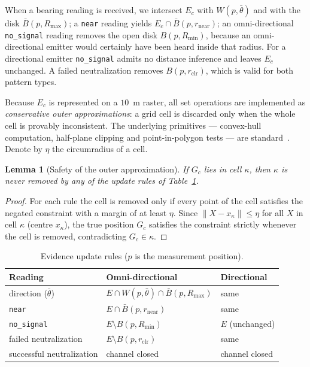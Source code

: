 \documentclass[preprint,12pt,3p]{elsarticle}
\newtheorem{lemma}[theorem]{Lemma}
\theoremstyle{definition}
\newcommand{\Rmin}{R_{\min}}
\newcommand{\Rmax}{R_{\max}}
\begin{document}
When a bearing reading is received, we intersect $E_c$ with $W(p,\bar\theta)$ and with the disk
$\bar B(p,\Rmax)$; a \texttt{near} reading yields $E_c\cap\bar B(p,r_{\mathrm{near}})$; an
omni-directional \texttt{no\_signal} reading removes the open disk $B(p,\Rmin)$, because an
omni-directional emitter would certainly have been heard inside that radius. For a directional
emitter \texttt{no\_signal} admits no distance inference and leaves $E_c$ unchanged. A failed
neutralization removes $B(p,r_{\mathrm{clr}})$, which is valid for both pattern types.

Because $E_c$ is represented on a $10$~m raster, all set operations are implemented as
\emph{conservative outer approximations}: a grid cell is discarded only when the whole cell is
provably inconsistent. The underlying primitives --- convex-hull computation, half-plane clipping
and point-in-polygon tests --- are standard~\cite{preparata1985}. Denote by $\eta$ the
circumradius of a cell.

\begin{lemma}[Safety of the outer approximation]
\label{lem:outer}
If $G_c$ lies in cell $\kappa$, then $\kappa$ is never removed by any of the update rules of
Table~\ref{tab:ops}.
\end{lemma}
\begin{proof}
For each rule the cell is removed only if every point of the cell satisfies the negated
constraint with a margin of at least $\eta$. Since $\|X-x_\kappa\|\le\eta$ for all $X$ in cell
$\kappa$ (centre $x_\kappa$), the true position $G_c$ satisfies the constraint strictly whenever
the cell is removed, contradicting $G_c\in\kappa$.
\end{proof}

\begin{table}[t]
\caption{Evidence update rules ($p$ is the measurement position).}
\label{tab:ops}
\centering
\small
\begin{tabular}{lll}
\toprule
Reading & Omni-directional & Directional \\
\midrule
direction ($\bar\theta$) & $E\cap W(p,\bar\theta)\cap\bar B(p,\Rmax)$ & same \\
\texttt{near} & $E\cap\bar B(p,r_{\mathrm{near}})$ & same \\
\texttt{no\_signal} & $E\setminus B(p,\Rmin)$ & $E$ (unchanged) \\
failed neutralization & $E\setminus B(p,r_{\mathrm{clr}})$ & same \\
successful neutralization & channel closed & channel closed \\
\bottomrule
\end{tabular}
\end{table}
\end{document}
